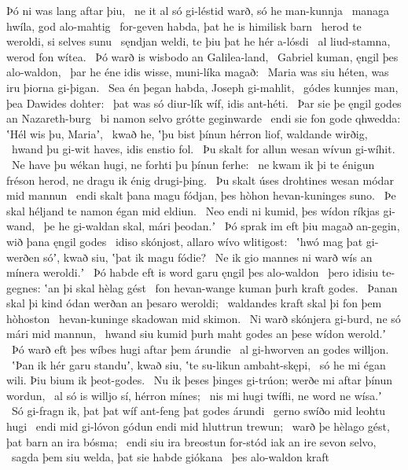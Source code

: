 Þó ni was lang aftar þiu, \hld\ ne it al só gi-léstid warð,
só he man-kunnja \hld\ managa hwíla,
god alo-mahtig \hld\ for-geven habda,
þat he is himilisk barn \hld\ herod te weroldi,
si selves sunu \hld\ sęndjan weldi,
te þiu þat he hér a-lósdi \hld\ al liud-stamna,
werod fon wítea. \hld\ Þó warð is wisbodo
an Galilea-land, \hld\ Gabriel kuman,
ęngil þes alo-waldon, \hld\ þar he éne idis wisse,
muni-líka magað: \hld\ Maria was siu héten,
was iru þiorna gi-þigan. \hld\ Sea én þegan habda,
Joseph gi-mahlit, \hld\ gódes kunnjes man,
þea Dawides dohter: \hld\ þat was só diur-lík wíf,
idis ant-héti. \hld\ Þar sie þe ęngil godes
an Nazareth-burg \hld\ bi namon selvo
grótte geginwarde \hld\ endi sie fon gode qhwedda:
ʽHél wis þu, Mariaʼ, \hld\ kwað he, ʽþu bist þínun hérron liof,
waldande wirðig, \hld\ hwand þu gi-wit haves,
idis enstio fol. \hld\ Þu skalt for allun wesan
wívun gi-wíhit. \hld\ Ne have þu wékan hugi,
ne forhti þu þínun ferhe: \hld\ ne kwam ik þi te énigun fréson herod,
ne dragu ik énig drugi-þing. \hld\ Þu skalt úses drohtines wesan
módar mid mannun \hld\ endi skalt þana magu fódjan,
þes hòhon hevan-kuninges suno. \hld\ Þe skal héljand te namon
égan mid eldiun. \hld\ Neo endi ni kumid,
þes wídon ríkjas gi-wand, \hld\ þe he gi-waldan skal,
mári þeodan.ʼ \hld\ Þó sprak im eft þiu magað an-gegin,
wið þana ęngil godes \hld\ idiso skónjost,
allaro wívo wlitigost: \hld\ ʽhwó mag þat gi-werðen sóʼ, kwað siu,
ʽþat ik magu fódie? \hld\ Ne ik gio mannes ni warð
wís an mínera weroldi.ʼ \hld\ Þó habde eft is word garu
ęngil þes alo-waldon \hld\ þero idisiu te-gegnes:
ʽan þi skal hèlag gést \hld\ fon hevan-wange
kuman þurh kraft godes. \hld\ Þanan skal þi kind ódan
werðan an þesaro weroldi; \hld\ waldandes kraft
skal þi fon þem hòhoston \hld\ hevan-kuninge
skadowan mid skimon. \hld\ Ni warð skónjera gi-burd,
ne só mári mid mannun, \hld\ hwand siu kumid þurh maht godes
an þese wídon werold.ʼ \hld\ Þó warð eft þes wíbes hugi
aftar þem árundie \hld\ al gi-hworven
an godes willjon. \hld\ ʽÞan ik hér garu standuʼ, kwað siu,
ʽte su-likun ambaht-skępi, \hld\ só he mi égan wili.
Þiu bium ik þeot-godes. \hld\ Nu ik þeses þinges gi-trúon;
werðe mi aftar þínun wordun, \hld\ al só is willjo sí,
hérron mínes; \hld\ nis mi hugi twífli,
ne word ne wísa.ʼ \hld\ Só gi-fragn ik, þat þat wíf ant-feng
þat godes árundi \hld\ gerno swíðo
mid leohtu hugi \hld\ endi mid gi-lóvon gódun
endi mid hluttrun trewun; \hld\ warð þe hèlago gést,
þat barn an ira bósma; \hld\ endi siu ira breostun for-stód
iak an ire sevon selvo, \hld\ sagda þem siu welda,
þat sie habde giókana \hld\ þes alo-waldon kraft
